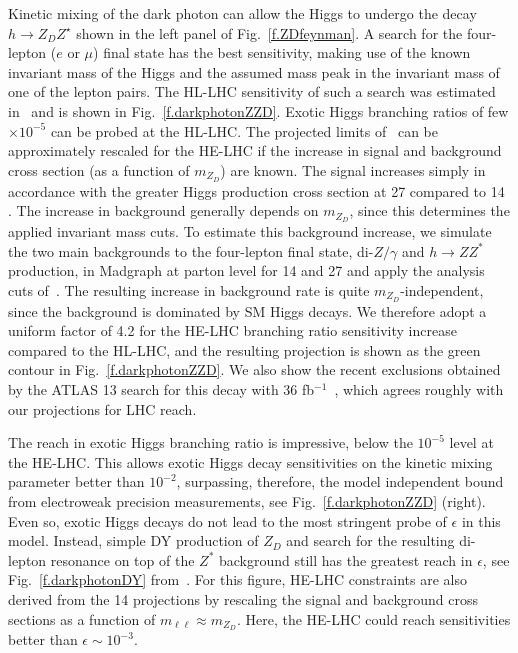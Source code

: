 Kinetic mixing of the dark photon can allow the Higgs to undergo the decay $h \to Z_D Z^{\star}$ shown in the left panel of Fig.~\ref{f.ZDfeynman}. A search for the four-lepton ($e$ or $\mu$) final state has the best sensitivity, making use of the known invariant mass of the Higgs and the assumed mass peak in the invariant mass of one of the lepton pairs. The HL-LHC sensitivity of such a search was estimated in~\cite{Curtin:2014cca} and is shown in Fig.~\ref{f.darkphotonZZD}. 
%
Exotic Higgs branching ratios of few$\times 10^{-5}$ can be probed at the HL-LHC. 
%
The projected limits of~\cite{Curtin:2014cca} can be approximately rescaled for the HE-LHC if the increase in signal and background cross section (as a function of $m_{Z_D}$) are known. 
%
The signal increases simply in accordance with the greater Higgs production cross section at 27 \UTeV compared to 14 \UTeV.
%
The increase in background generally depends on $m_{Z_D}$, since this determines the applied invariant mass cuts. To estimate this background increase, we simulate the two main backgrounds to the four-lepton final state, di-$Z/\gamma$ and $h \to Z Z^*$ production, in Madgraph at parton level for 14 and 27 \UTeV and apply the analysis cuts of~\cite{Curtin:2014cca}.
%
The resulting increase in background rate is quite $m_{Z_D}$-independent, since the background is dominated by SM Higgs decays. We therefore adopt a uniform factor of 4.2  for the HE-LHC branching ratio sensitivity increase compared to the HL-LHC, and the resulting projection is shown as the green contour in Fig.~\ref{f.darkphotonZZD}.
%
We also show the recent exclusions obtained by the ATLAS 13 \UTeV search for this decay with 36 fb$^{-1}$~\cite{Aaboud:2018fvk}, which agrees roughly with our projections for LHC reach. 


The reach in exotic Higgs branching ratio is impressive, below the $10^{-5}$ level at the HE-LHC.
This allows exotic Higgs decay sensitivities on the kinetic mixing parameter better than $10^{-2}$, surpassing, therefore, the model independent bound from electroweak precision measurements, %
see Fig.~\ref{f.darkphotonZZD} (right). 
%
Even so, exotic Higgs decays do not lead to the most stringent probe of $\epsilon$ in this model. Instead, simple DY production of $Z_D$ and search for the resulting di-lepton resonance on top of the $Z^*$ background still has the greatest reach in $\epsilon$, see Fig.~\ref{f.darkphotonDY} from~\cite{Curtin:2014cca}. For this figure, HE-LHC constraints are also derived from the 14 \UTeV projections by rescaling the signal and background cross sections as a function of $m_{\ell \ell} \approx m_{Z_D}$. Here, the HE-LHC could reach sensitivities better than $\epsilon \sim 10^{-3}$. 

